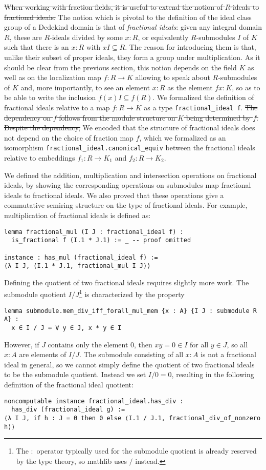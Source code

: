 \documentclass[a4paper,USenglish,cleveref, autoref, thm-restate]{lipics-v2021}
\newcommand{\lean}[1]{\texttt{#1}\xspace} %
\newcommand{\mathlib}{\textsf{mathlib}\xspace}
\begin{document}
\st{When working with fraction fields, it is useful to extend the notion of $R$-ideals to fractional ideals:} The notion which is pivotal to the definition of the ideal class group of a Dedekind domain is that of \emph{fractional ideals}: given any integral domain $R$, these are $R$-ideals divided by some $x : R$,
or equivalently $R$-submodules $I$ of $K$ such that there is an $x : R$ with $x I \subseteq R$. The reason for introducing them is that, unlike their subset of proper ideals, they form a group under multiplication. As it should be clear from the previous section, this notion depends on the field $K$ as well as on the localization map $f\colon R\to K$ allowing to speak about $R$-submodules of $K$ and, more importantly, to see an element $x:R$ as the element $f x : K$, so as to be able to write the inclusion $f(x)I\subseteq f(R)$. We formalized the definition of fractional ideals relative to a map $f\colon R\to K$ as a type \lean{fractional\_ideal f}.
\st{The dependency on $f$ follows from the module structure on $K$ being determined by $f$.
Despite the dependency, } We encoded that the structure of fractional ideals does not depend on the choice of fraction map $f$,
which we formalized as an isomorphism \lean{fractional\_ideal.canonical\_equiv} between the fractional ideals relative to embeddings $f_1\colon R\to K_1$ and $f_2\colon R\to K_2$.

We defined the addition, multiplication and intersection operations on fractional ideals,
by showing the corresponding operations on submodules map fractional ideals to fractional ideals.
We also proved that these operations give a commutative semiring structure on the type of fractional ideals.
For example, multiplication of fractional ideals is defined as:
\begin{lstlisting}
lemma fractional_mul (I J : fractional_ideal f) :
  is_fractional f (I.1 * J.1) := _ -- proof omitted

instance : has_mul (fractional_ideal f) :=
⟨λ I J, ⟨I.1 * J.1, fractional_mul I J⟩⟩
\end{lstlisting}

Defining the quotient of two fractional ideals requires slightly more work.
The submodule quotient $I / J$\footnote{The $:$ operator typically used for the submodule quotient is already reserved by the type theory, so \mathlib uses $/$ instead.} is characterized by the property
\begin{lstlisting}
lemma submodule.mem_div_iff_forall_mul_mem {x : A} {I J : submodule R A} :
  x ∈ I / J ↔ ∀ y ∈ J, x * y ∈ I
\end{lstlisting}
However, if $J$ contains only the element $0$,
then $xy = 0 \in I$ for all $y \in J$, so all $x : A$ are elements of $I / J$.
The submodule consisting of all $x : A$ is not a fractional ideal in general,
so we cannot simply define the quotient of two fractional ideals to be the submodule quotient.
Instead we set $I / 0 = 0$, resulting in the following definition of the fractional ideal quotient:
\begin{lstlisting}
noncomputable instance fractional_ideal.has_div :
  has_div (fractional_ideal g) :=
⟨λ I J, if h : J = 0 then 0 else ⟨I.1 / J.1, fractional_div_of_nonzero h⟩⟩
\end{lstlisting}
\end{document}

